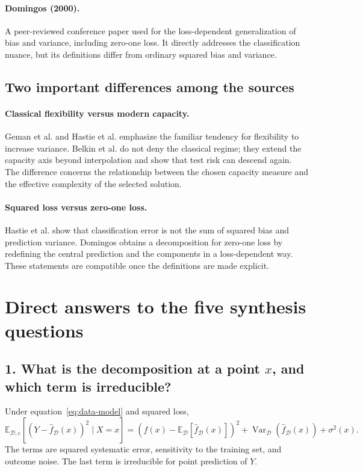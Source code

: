 \documentclass[11pt,a4paper]{article}
\newcommand{\ED}{\mathbb{E}_{\mathcal D}}
\newcommand{\VarD}{\operatorname{Var}_{\mathcal D}}
\begin{document}
\paragraph{Domingos (2000).}
A peer-reviewed conference paper used for the loss-dependent generalization of bias and variance, including zero-one loss. It directly addresses the classification nuance, but its definitions differ from ordinary squared bias and variance.

\subsection{Two important differences among the sources}

\paragraph{Classical flexibility versus modern capacity.}
Geman et al. and Hastie et al. emphasize the familiar tendency for flexibility to increase variance. Belkin et al. do not deny the classical regime; they extend the capacity axis beyond interpolation and show that test risk can descend again. The difference concerns the relationship between the chosen capacity measure and the effective complexity of the selected solution.

\paragraph{Squared loss versus zero-one loss.}
Hastie et al. show that classification error is not the sum of squared bias and prediction variance. Domingos obtains a decomposition for zero-one loss by redefining the central prediction and the components in a loss-dependent way. These statements are compatible once the definitions are made explicit.

\section{Direct answers to the five synthesis questions}
\label{sec:answers}

\subsection*{1. What is the decomposition at a point $x$, and which term is irreducible?}

Under equation~\eqref{eq:data-model} and squared loss,
\begin{equation*}
  \mathbb E_{\mathcal D,\varepsilon}
  [(Y-\widehat f_{\mathcal D}(x))^2\mid X=x]
  =\left(f(x)-\ED[\widehat f_{\mathcal D}(x)]\right)^2
  +\VarD(\widehat f_{\mathcal D}(x))
  +\sigma^2(x).
\end{equation*}
The terms are squared systematic error, sensitivity to the training set, and outcome noise. The last term is irreducible for point prediction of $Y$.
\end{document}
